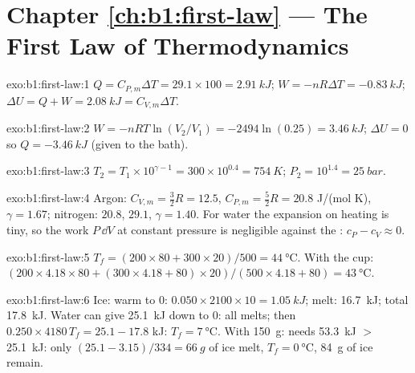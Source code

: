 \section*{Chapter \ref{ch:b1:first-law} --- The First Law of Thermodynamics}

\begin{solution}{exo:b1:first-law:1}
$Q = C_{P,m}\Delta T = 29.1 \times 100 = \qty{2.91}{kJ}$; $W = -nR\Delta T =
\qty{-0.83}{kJ}$; $\Delta U = Q + W = \qty{2.08}{kJ} = C_{V,m}\Delta T$.
\end{solution}

\begin{solution}{exo:b1:first-law:2}
$W = -nRT\ln(V_2/V_1) = -2494\ln(0.25) = \qty{+3.46}{kJ}$; $\Delta U = 0$ so
$Q = \qty{-3.46}{kJ}$ (given to the bath).
\end{solution}

\begin{solution}{exo:b1:first-law:3}
$T_2 = T_1 \times 10^{\gamma - 1} = 300 \times 10^{0.4} = \qty{754}{K}$; $P_2 =
10^{1.4} = \qty{25}{bar}$.
\end{solution}

\begin{solution}{exo:b1:first-law:4}
Argon: $C_{V,m} = \tfrac32 R = 12.5$, $C_{P,m} = \tfrac52 R = 20.8$ J/(mol K),
$\gamma = 1.67$; nitrogen: $20.8$, $29.1$, $\gamma = 1.40$. For water the
expansion on heating is tiny, so the work $P\,\dd V$ at constant pressure
is negligible against the : $c_P - c_V \approx 0$.
\end{solution}

\begin{solution}{exo:b1:first-law:5}
$T_f = (200 \times 80 + 300 \times 20)/500 = \qty{44}{\degreeCelsius}$. With the
cup: $(200 \times 4.18 \times 80 + (300 \times 4.18 + 80) \times 20)/(500 \times
4.18 + 80) = \qty{43}{\degreeCelsius}$.
\end{solution}

\begin{solution}{exo:b1:first-law:6}
Ice: warm to $0$: $0.050 \times 2100 \times 10 = \qty{1.05}{kJ}$; melt:
\qty{16.7}{kJ}; total \qty{17.8}{kJ}. Water can give \qty{25.1}{kJ} down to
$0$: all melts; then $0.250 \times 4180\,T_f = 25.1 - 17.8$ kJ: $T_f =
\qty{7}{\degreeCelsius}$. With \qty{150}{g}: needs \qty{53.3}{kJ} $>$ \qty{25.1}{kJ}:
only $(25.1 - 3.15)/334 = \qty{66}{g}$ of ice melt, $T_f = \qty{0}{\degreeCelsius}$,
\qty{84}{g} of ice remain.
\end{solution}

